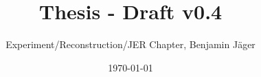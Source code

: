 

\endofdump


% 

\newif\ifIMAGES
\IMAGEStrue




\author{Experiment/Reconstruction/JER Chapter, Benjamin Jäger}
\date{\today}
\title{Thesis - Draft v0.4}





\maketitle




\tableofcontents


\newcommand{\chapterdir}{chapters}
%












